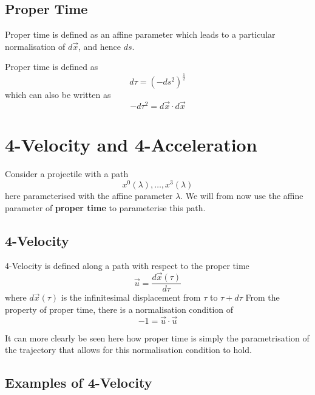 \subsection{Proper Time}
Proper time is defined as an affine parameter which leads to a particular normalisation of $d\vec{x}$, and hence $ds$.
\begin{definition}
    Proper time is defined as
    $$ d\tau = \left(-ds^2\right)^{\frac{1}{2}} $$
    which can also be written as
    $$ -d\tau^2 = d\vec{x}\cdot d\vec{x} $$
\end{definition}

\section{4-Velocity and 4-Acceleration}
Consider a projectile with a path
$$ x^0(\lambda), \dots, x^3(\lambda) $$
here parameterised with the affine parameter $\lambda$. We will from now use the affine parameter of \textbf{proper time} to parameterise this path.
\subsection{4-Velocity}
\begin{definition}[4-Velocity]
    4-Velocity is defined along a path with respect to the proper time
    $$ \vec{u} = \frac{d \vec{x}(\tau)}{d\tau} $$
    where $d\vec{x}(\tau)$ is the infinitesimal displacement from $\tau$ to $\tau + d\tau$
    From the property of proper time, there is a normalisation condition of
    $$ -1 = \vec{u} \cdot \vec{u} $$
\end{definition}
It can more clearly be seen here how proper time is simply the parametrisation of the trajectory that allows for this normalisation condition to hold.
\subsection{Examples of 4-Velocity}

